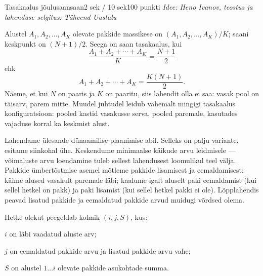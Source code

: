 \begin{yl}{6}{Tasakaalus jõulusaan}{saan}{2 sek / 10 sek}{100 punkti}
  \emph{Idee: Heno Ivanov, teostus ja lahenduse selgitus: Tähvend Uustalu}

  Alustel $A_1, A_2, \ldots, A_K$ olevate pakkide massikese on $(A_1, A_2, \ldots, A_K) / K$;
  saani keskpunkt on $(N + 1) / 2$. Seega on saan tasakaalus, kui
  $$ \frac{A_1 + A_2 + \cdots + A_K}{K} = \frac{N + 1}{2} $$
  ehk
  $$ A_1 + A_2 + \cdots + A_K = \frac{K(N + 1)}{2}. $$
  Näeme, et kui $N$ on paaris ja $K$ on paaritu, siis lahendit olla ei saa:
  vasak pool on täisarv, parem mitte. Muudel juhtudel leidub vähemalt mingigi
  tasakaalus konfiguratsioon: pooled kastid vasakusse serva, pooled paremale, kasutades vajaduse
  korral ka keskmist alust.

  Lahendame ülesande dünaamilise plaanimise abil. Selleks on palju variante, esitame siinkohal
  ühe. Keskendume minimaalse käikude arvu leidmisele --- võimaluste arvu loendamine tuleb sellest
  lahendusest loomulikul teel välja. Pakkide ümbertõstmise asemel mõtleme pakkide lisamisest ja
  eemaldamisest: käime alused vasakult paremale läbi; kaalume igalt aluselt paki eemaldamist
  (kui sellel hetkel on pakk) ja paki lisamist (kui sellel hetkel pakki ei ole).
  Lõpplahendis peavad lisatud pakkide ja eemaldatud pakkide arvud muidugi võrdsed olema.

  Hetke olekut peegeldab kolmik $(i, j, S)$, kus:
  \begin{xitem}
  \item $i$ on läbi vaadatud aluste arv;
  \item $j$ on eemaldatud pakkide arvu ja lisatud pakkide arvu vahe;
  \item $S$ on alustel $1 \ldots i$ olevate pakkide asukohtade summa.
  \end{xitem}


\end{yl}
